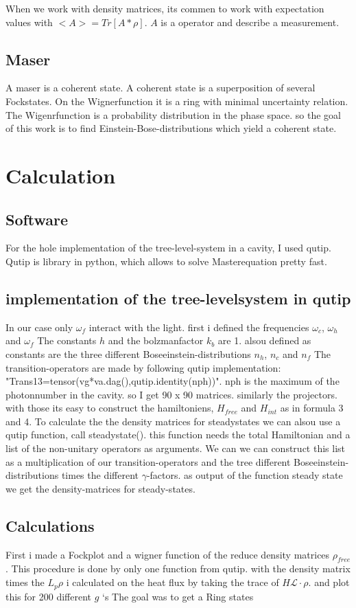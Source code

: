 \documentclass[12pt,a4paper]{article}
\begin{document}
 When we work with density matrices, its commen to work with expectation values with $<A>=Tr[A*\rho]$.
 $A$ is a operator and describe a measurement.

\subsection{Maser}
A maser is a coherent state.  A coherent state is a superposition of several Fockstates.
On the Wignerfunction it is a ring with minimal uncertainty relation. 
The Wigenrfunction is a probability distribution in the phase space. 
so the goal of this work is to find Einstein-Bose-distributions which yield a coherent state.
 


\section{Calculation}
\subsection{Software}
For the hole implementation of the tree-level-system in a cavity, I used qutip. Qutip is library in python, which allows to solve Masterequation pretty fast.
\subsection{implementation of the tree-levelsystem in qutip}
In our case only $\omega_f$ interact with the light. 
first i defined the frequencies $ \omega_c $, $ \omega_h$ and $ \omega_f$ 
The constants $h $ and the bolzmanfactor $k_b$ are 1.
alsou defined as constants are the three different Boseeinstein-distributions $n_h$, $n_c$ and $n_f$
The transition-operators are  made by following qutip implementation: "Trans13=tensor(vg*va.dag(),qutip.identity(nph))". nph is the maximum of the photonnumber in the cavity. so I get 90 x 90 matrices. 
similarly the projectors. 
with those its easy to construct the hamiltoniens, $H_{free}$ and $H_{int}$ as in formula 3 and 4.
To calculate the the density matrices for steadystates we can alsou use a qutip function, call steadystate().
this function needs the total Hamiltonian and a list of the non-unitary operators as arguments.
We can we can construct this list as a multiplication of our transition-operators and the tree different Boseeinstein-distributions times the different $\gamma$-factors. 
as output of the function steady state we get the density-matrices for steady-states.
\subsection{Calculations}
First i made a Fockplot and a wigner function of the reduce density matrices $\rho_{free}$ . This procedure is done by only one function from qutip.
with the density matrix times the $L_{p}\rho$ i calculated on the heat flux by taking the trace of $H \mathcal{L}\cdot \rho$. 
and plot this for 200 different  $g$ `s 
The goal was to get a Ring states
\end{document}
